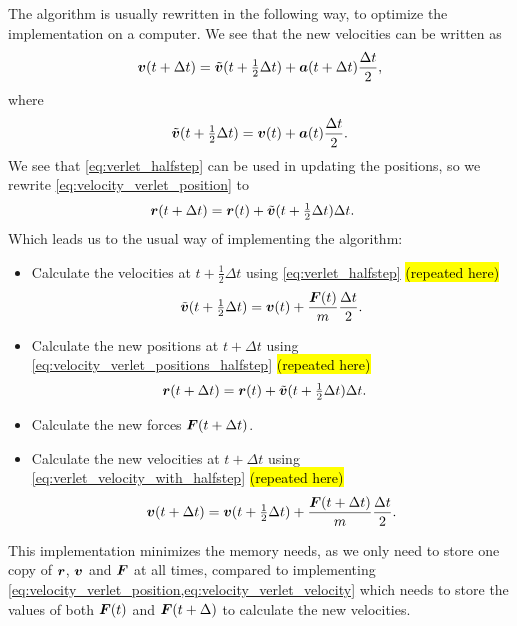 The algorithm is usually rewritten in the following way, to optimize the implementation on a computer. We see that the new velocities can be written as
\begin{align}
    \vvec(t+\Delta t) = \tilde\vvec(t + \tfrac{1}{2}\Delta t) + \avec(t+\Delta t)\frac{\Delta t}{2}, %
\end{align}
where
\begin{align}
    \tilde\vvec(t + \tfrac{1}{2}\Delta t) = \vvec(t) + \avec(t)\frac{\Delta t}{2}. %
\end{align}
We see that \cref{eq:verlet_halfstep} can be used in updating the positions, so we rewrite \cref{eq:velocity_verlet_position} to
\begin{align}
    \rvec(t + \Delta t) &= \rvec(t) + \tilde\vvec(t+\tfrac{1}{2}\Delta t)\Delta t. %
\end{align}
Which leads us to the usual way of implementing the algorithm\cite{allen1989computer}:
\begin{itemize}
    \item Calculate the velocities at $t+\tfrac{1}{2}\Delta t$ using \cref{eq:verlet_halfstep} \hl{(repeated here)}
    \begin{align*}
        \tilde{\boldsymbol{v}}(t + \tfrac{1}{2}\Delta t) = \boldsymbol{v}(t) + \frac{\boldsymbol{F}(t)}{m}\frac{\Delta t}{2}.
    \end{align*}
    \item Calculate the new positions at $t + \Delta t$ using \cref{eq:velocity_verlet_positions_halfstep} \hl{(repeated here)}
    \begin{align*}
        \boldsymbol{r}(t + \Delta t) &= \boldsymbol{r}(t) + \tilde{\boldsymbol{v}}(t+\tfrac{1}{2}\Delta t)\Delta t.
    \end{align*}
    \item Calculate the new forces $\boldsymbol{F}(t+\Delta t)$.
    \item Calculate the new velocities at $t+\Delta t$ using \cref{eq:verlet_velocity_with_halfstep} \hl{(repeated here)}
    \begin{align*}
        \boldsymbol{v}(t+\Delta t) = \boldsymbol{v}(t + \tfrac{1}{2}\Delta t) + \frac{\boldsymbol{F}(t + \Delta t)}{m}\frac{\Delta t}{2}.
    \end{align*}
\end{itemize}
This implementation minimizes the memory needs, as we only need to store one copy of $\boldsymbol{r}$, $\boldsymbol{v}$ and $\boldsymbol{F}$ at all times, compared to implementing \cref{eq:velocity_verlet_position,eq:velocity_verlet_velocity} which needs to store the values of both $\boldsymbol{F}(t)$ and $\boldsymbol{F}(t+\Delta)$ to calculate the new velocities. 

